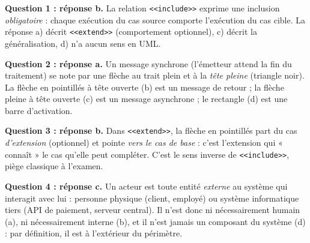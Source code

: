\documentclass[11pt]{article}
\begin{document}
\begin{corrige}
\textbf{Question 1 : réponse b.} La relation \texttt{<<include>>} exprime une inclusion \emph{obligatoire} : chaque exécution du cas source comporte l'exécution du cas cible. La réponse a) décrit \texttt{<<extend>>} (comportement optionnel), c) décrit la généralisation, d) n'a aucun sens en UML.

\textbf{Question 2 : réponse a.} Un message synchrone (l'émetteur attend la fin du traitement) se note par une flèche au trait plein et à la \emph{tête pleine} (triangle noir). La flèche en pointillés à tête ouverte (b) est un message de retour ; la flèche pleine à tête ouverte (c) est un message asynchrone ; le rectangle (d) est une barre d'activation.

\textbf{Question 3 : réponse b.} Dans \texttt{<<extend>>}, la flèche en pointillés part du cas \emph{d'extension} (optionnel) et pointe \emph{vers le cas de base} : c'est l'extension qui « connaît » le cas qu'elle peut compléter. C'est le sens inverse de \texttt{<<include>>}, piège classique à l'examen.

\textbf{Question 4 : réponse c.} Un acteur est toute entité \emph{externe} au système qui interagit avec lui : personne physique (client, employé) ou système informatique tiers (API de paiement, serveur central). Il n'est donc ni nécessairement humain (a), ni nécessairement interne (b), et il n'est jamais un composant du système (d) : par définition, il est à l'extérieur du périmètre.
\end{corrige}
\end{document}

